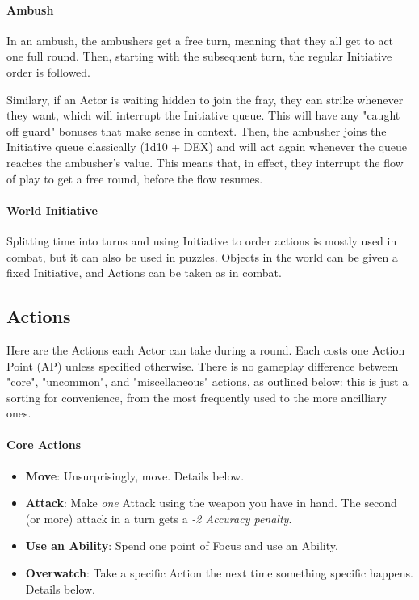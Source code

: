 \paragraph{Ambush}

In an ambush, the ambushers get a free turn, meaning that they all get to act one full round. Then, starting with the subsequent turn, the regular Initiative order is followed.

Similary, if an Actor is waiting hidden to join the fray, they can strike whenever they want, which will interrupt the Initiative queue. This will have any "caught off guard" bonuses that make sense in context. Then, the ambusher joins the Initiative queue classically (1d10 + DEX) and will act again whenever the queue reaches the ambusher's value. This means that, in effect, they interrupt the flow of play to get a free round, before the flow resumes.

\paragraph{World Initiative} 

Splitting time into turns and using Initiative to order actions is mostly used in combat, but it can also be used in puzzles. Objects in the world can be given a fixed Initiative, and Actions can be taken as in combat. 


\subsection{Actions}
\label{actions}

Here are the Actions each Actor can take during a round. Each costs one Action Point (AP) unless specified otherwise. There is no gameplay difference between "core", "uncommon", and "miscellaneous" actions, as outlined below: this is just a sorting for convenience, from the most frequently used to the more ancilliary ones.

\paragraph{Core Actions}
\begin{itemize}
    \item \textbf{Move}: Unsurprisingly, move. Details below.
    \item \textbf{Attack}: Make \textit{one} Attack using the weapon you have in hand. The second (or more) attack in a turn gets a \textit{-2 Accuracy penalty}.
    \item \textbf{Use an Ability}: Spend one point of Focus and use an Ability.
    \item \textbf{Overwatch}: Take a specific Action the next time something specific happens. Details below.
\end{itemize}

